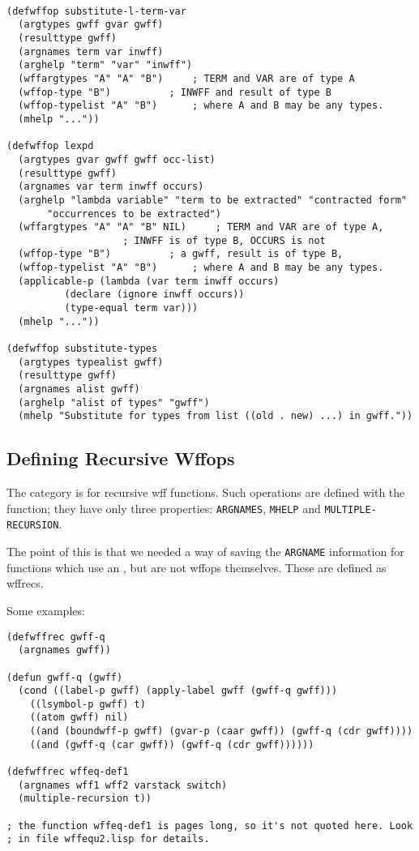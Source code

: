 \begin{verbatim}

(defwffop substitute-l-term-var
  (argtypes gwff gvar gwff)
  (resulttype gwff)
  (argnames term var inwff)
  (arghelp "term" "var" "inwff")
  (wffargtypes "A" "A" "B")		; TERM and VAR are of type A
  (wffop-type "B")			; INWFF and result of type B
  (wffop-typelist "A" "B")		; where A and B may be any types.
  (mhelp "..."))

(defwffop lexpd
  (argtypes gvar gwff gwff occ-list)
  (resulttype gwff)
  (argnames var term inwff occurs)
  (arghelp "lambda variable" "term to be extracted" "contracted form"
	   "occurrences to be extracted")
  (wffargtypes "A" "A" "B" NIL)		; TERM and VAR are of type A,
					; INWFF is of type B, OCCURS is not
  (wffop-type "B")			; a gwff, result is of type B,
  (wffop-typelist "A" "B")		; where A and B may be any types.
  (applicable-p (lambda (var term inwff occurs)
		  (declare (ignore inwff occurs))
		  (type-equal term var)))
  (mhelp "..."))

(defwffop substitute-types
  (argtypes typealist gwff)
  (resulttype gwff)
  (argnames alist gwff)
  (arghelp "alist of types" "gwff")
  (mhelp "Substitute for types from list ((old . new) ...) in gwff."))

\end{verbatim}

\subsection{Defining Recursive Wffops}

The category  is for recursive wff functions. 
Such operations are defined with the  function;
they have only three properties: {\tt ARGNAMES}, {\tt MHELP}
and {\tt MULTIPLE-RECURSION}.

The point of this is that we needed a way of saving the 
{\tt ARGNAME} information for functions which
use an , but are not wffops themselves.
These are defined as wffrecs.

Some examples: 

\begin{verbatim}
(defwffrec gwff-q
  (argnames gwff))

(defun gwff-q (gwff)
  (cond ((label-p gwff) (apply-label gwff (gwff-q gwff)))
	((lsymbol-p gwff) t)
	((atom gwff) nil)
	((and (boundwff-p gwff) (gvar-p (caar gwff)) (gwff-q (cdr gwff))))
	((and (gwff-q (car gwff)) (gwff-q (cdr gwff))))))

(defwffrec wffeq-def1
  (argnames wff1 wff2 varstack switch)
  (multiple-recursion t))
 
; the function wffeq-def1 is pages long, so it's not quoted here. Look 
; in file wffequ2.lisp for details.

\end{verbatim}

